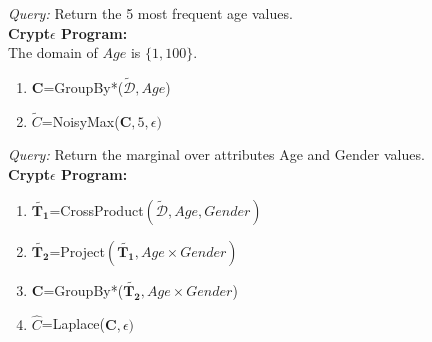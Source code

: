 
\begin{exmp}\textit{Query: } Return the 5 most frequent age values.\\\textbf{Crypt$\epsilon$ Program:}\\ The domain of $Age$ is $\{1,100\}$.\end{exmp}\begin{enumerate} \item $\mathbf{C}$=\textsf{GroupBy*}($\boldsymbol{\tilde{\mathcal{D}}},Age$)   \item $\tilde{C}$=\textsf{NoisyMax}($\mathbf{C},5,\epsilon)$\end{enumerate}
\begin{exmp}\textit{Query: } Return the marginal over attributes Age and Gender values.\\\textbf{Crypt$\epsilon$ Program:}\end{exmp} \begin{enumerate} \item $\tilde{\mathbf{T_1}}$=\textsf{CrossProduct}$(\boldsymbol{\tilde{\mathcal{D}}},Age,Gender)$ \item $\tilde{\mathbf{T_2}}$=\textsf{Project}$(\tilde{\mathbf{T_1}}, Age \times Gender)$\item  $\mathbf{C}$=\textsf{GroupBy*}($\tilde{\mathbf{T_2}},Age \times Gender $)   \item $\hat{C}$=\textsf{Laplace}($\mathbf{C},\epsilon)$\end{enumerate}

